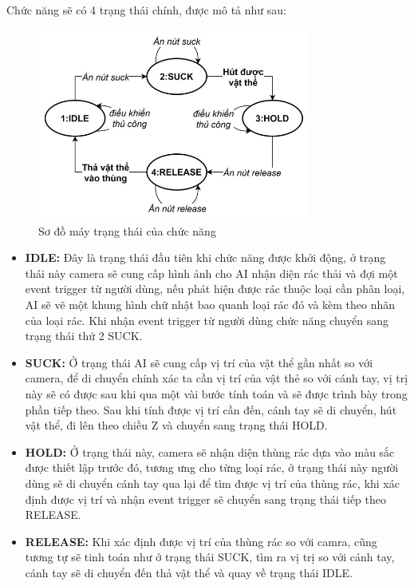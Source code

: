 Chức năng sẽ có 4 trạng thái chính, được mô tả như sau:
    \begin{figure}[!h]
        \centering
        \includegraphics[width=0.8\textwidth]{Images/Implementation/AI/state-machine_1.jpg}
        \caption{Sơ đồ máy trạng thái của chức năng}
    \end{figure}
\begin{itemize}
    \item \textbf{IDLE:} Đây là trạng thái đầu tiên khi chức năng được khởi động, ở trạng thái này camera sẽ cung cấp hình ảnh cho AI nhận diện rác thải và đợi một event trigger từ người dùng, nếu phát hiện được rác thuộc loại cần phân loại, AI sẽ vẽ một khung hình chữ nhật bao quanh loại rác đó và kèm theo nhãn của loại rác. Khi nhận event trigger từ người dùng chức năng chuyển sang trạng thái thứ 2 SUCK.
    \item \textbf{SUCK:} Ở trạng thái AI sẽ cung cấp vị trí của vật thể gần nhất so với camera, để di chuyển chính xác ta cần vị trí của vật thẻ so với cánh tay, vị trị này sẽ có được sau khi qua một vài bước tính toán và sẽ được trình bày trong phần tiếp theo. Sau khi tính được vị trí cần đến, cánh tay sẽ di chuyển, hút vật thể, đi lên theo chiều Z và chuyển sang trạng thái HOLD.
    \item  \textbf{HOLD:} Ở trạng thái này, camera sẽ nhận diện thùng rác dựa vào màu sắc được thiết lập trước đó, tương ưng cho từng loại rác, ở trạng thái này người dùng sẽ di chuyển cánh tay qua lại để tìm được vị trí của thùng rác, khi xác định được vị trí và nhận event trigger sẽ chuyển sang trạng thái tiếp theo RELEASE.
    \item \textbf{RELEASE:} Khi xác định được vị trí của thùng rác so với camra, cũng tương tự sẽ tinh toán như ở trạng thái SUCK, tìm ra vị trị so với cánh tay, cánh tay sẽ di chuyển đến thả vật thể và quay về trạng thái IDLE.
\end{itemize}
